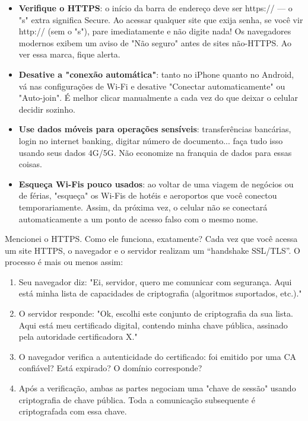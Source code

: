 \begin{itemize}
  \item \textbf{Verifique o HTTPS}: o início da barra de endereço deve ser https:// — o "s" extra significa Secure. Ao acessar qualquer site que exija senha, se você vir http:// (sem o "s"), pare imediatamente e não digite nada! Os navegadores modernos exibem um aviso de "Não seguro" antes de sites não-HTTPS. Ao ver essa marca, fique alerta.
  \item \textbf{Desative a "conexão automática"}: tanto no iPhone quanto no Android, vá nas configurações de Wi-Fi e desative "Conectar automaticamente" ou "Auto-join". É melhor clicar manualmente a cada vez do que deixar o celular decidir sozinho.
  \item \textbf{Use dados móveis para operações sensíveis}: transferências bancárias, login no internet banking, digitar número de documento... faça tudo isso usando seus dados 4G/5G. Não economize na franquia de dados para essas coisas.
  \item \textbf{Esqueça Wi-Fis pouco usados}: ao voltar de uma viagem de negócios ou de férias, "esqueça" os Wi-Fis de hotéis e aeroportos que você conectou temporariamente. Assim, da próxima vez, o celular não se conectará automaticamente a um ponto de acesso falso com o mesmo nome.
\end{itemize}


Mencionei o HTTPS. Como ele funciona, exatamente? Cada vez que você acessa um site HTTPS, o navegador e o servidor realizam um “handshake SSL/TLS”. O processo é mais ou menos assim:

\begin{enumerate}
  \item Seu navegador diz: "Ei, servidor, quero me comunicar com segurança. Aqui está minha lista de capacidades de criptografia (algoritmos suportados, etc.)."
  \item O servidor responde: "Ok, escolhi este conjunto de criptografia da sua lista. Aqui está meu certificado digital, contendo minha chave pública, assinado pela autoridade certificadora X."
  \item O navegador verifica a autenticidade do certificado: foi emitido por uma CA confiável? Está expirado? O domínio corresponde?
  \item Após a verificação, ambas as partes negociam uma "chave de sessão" usando criptografia de chave pública. Toda a comunicação subsequente é criptografada com essa chave.
\end{enumerate}

